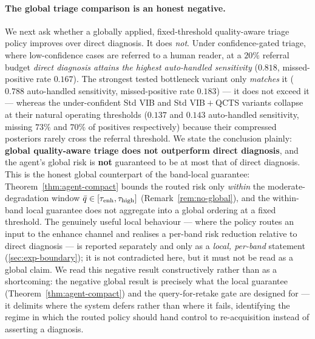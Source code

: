 \paragraph{The global triage comparison is an honest negative.}
We next ask whether a globally applied, fixed-threshold quality-aware triage policy
improves over direct diagnosis. It does \emph{not}. Under confidence-gated triage,
where low-confidence cases are referred to a human reader, at a $20\%$ referral budget
\emph{direct diagnosis attains the highest auto-handled sensitivity} ($0.818$,
missed-positive rate $0.167$). The strongest tested bottleneck variant only
\emph{matches} it ($0.788$ auto-handled sensitivity, missed-positive rate $0.183$) ---
it does not exceed it --- whereas the under-confident Std VIB and Std VIB${}+{}$QCTS
variants collapse at their natural operating thresholds ($0.137$ and $0.143$
auto-handled sensitivity, missing $73\%$ and $70\%$ of positives respectively) because
their compressed posteriors rarely cross the referral threshold. We state the
conclusion plainly: \textbf{global quality-aware triage does not outperform direct
diagnosis}, and the agent's global risk is \textbf{not} guaranteed to be at most that
of direct diagnosis. This is the honest global counterpart of the band-local
guarantee: Theorem~\ref{thm:agent-compact} bounds the routed risk only \emph{within}
the moderate-degradation window $\bar{q}\in[\tau_{\mathrm{enh}},\tau_{\mathrm{high}}]$ (Remark~\ref{rem:no-global}),
and the within-band local guarantee does not aggregate into a global ordering at a
fixed threshold. The genuinely useful local behaviour --- where the policy routes an
input to the enhance channel and realises a per-band risk reduction relative to direct
diagnosis --- is reported separately and only as a \emph{local, per-band} statement
(\cref{sec:exp-boundary}); it is not contradicted here, but it must not be read as a
global claim. We read this negative result constructively rather than as a shortcoming: the
negative global result is precisely what the local guarantee (Theorem~\ref{thm:agent-compact})
and the query-for-retake gate are designed for --- it delimits where the system defers rather than
where it fails, identifying the regime in which the routed policy should hand control to
re-acquisition instead of asserting a diagnosis.

